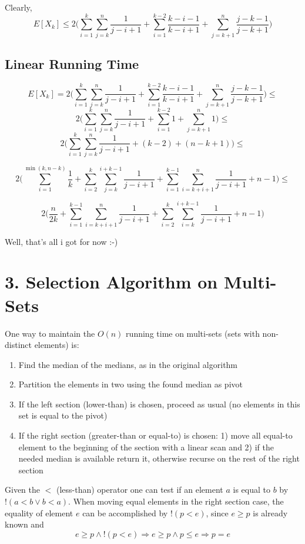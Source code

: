 \documentclass[10pt,oneside,a4paper,final,english]{memoir}
\begin{document}
Clearly,
\[ E[X_k] \leq 2 \Big(\sum_{i=1}^k \sum_{j=k}^n \frac1{j-i+1} +
\sum_{i=1}^{k-2} \frac{k-i-1}{k-i+1} +
\sum_{j=k+1}^{n} \frac{j-k-1}{j-k+1}
 \Big)\]

\subsection{Linear Running Time}
\[ E[X_k] =
2 \Big(\sum_{i=1}^k \sum_{j=k}^n \frac1{j-i+1} +
\sum_{i=1}^{k-2} \frac{k-i-1}{k-i+1} +
\sum_{j=k+1}^{n} \frac{j-k-1}{j-k+1}
 \Big) \leq \]
\[
2 \Big(\sum_{i=1}^k \sum_{j=k}^n \frac1{j-i+1} +
\sum_{i=1}^{k-2} 1 +
\sum_{j=k+1}^{n} 1
 \Big) \leq \]
\[
2 \Big(\sum_{i=1}^k \sum_{j=k}^n \frac1{j-i+1} +
(k-2) +
(n - k+1)
 \Big) \leq \]


\[ 2 \Big(\sum_{i=1}^{\min(k,n-k)} \frac1{k} +
\sum_{i=2}^{k} \sum_{j=k}^{i+k-1} \frac1{j-i+1} +
\sum_{i=1}^{k-1} \sum_{i=k+i+1}^n \frac1{j-i+1} +
n - 1
 \Big) \leq \]


\[ 2 \Big(
\frac{n}{2k} +
\sum_{i=1}^{k-1} \sum_{i=k+i+1}^n \frac1{j-i+1} +
\sum_{i=2}^{k} \sum_{i=k}^{i+k-1} \frac1{j-i+1} +
n - 1
 \Big) \]

Well, that's all i got for now :-)


\section*{3. Selection Algorithm on Multi-Sets}
One way to maintain the $O(n)$ running time on multi-sets (sets with
non-distinct elements) is:
\begin{enumerate}
\item Find the median of the medians, as in the original algorithm
\item Partition the elements in two using the found median as pivot
\item If the left section (lower-than) is chosen, proceed as usual (no
  elements in this set is equal to the pivot)
\item If the right section (greater-than or equal-to) is chosen: 1)
  move all equal-to element to the beginning of the section with a
  linear scan and 2) if the needed median is available return it,
  otherwise recurse on the rest of the right section
\end{enumerate}

Given the $<$ (less-than) operator one can test if an element $a$ is
equal to $b$ by $!(a < b \vee b < a)$. When moving equal elements in
the right section case, the equality of element $e$ can be
accomplished by $!(p < e)$, since $e \geq p$ is already known and
\[e\geq p \wedge !(p<e) \Rightarrow e \geq p \wedge p \leq e \Rightarrow p = e\]
\end{document}

